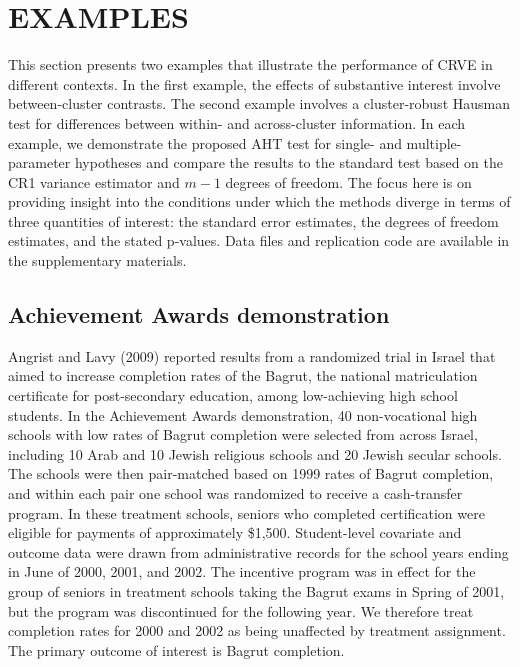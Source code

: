 \documentclass[12pt]{article}
\begin{document}
\hypertarget{sec:examples}{%
\section{EXAMPLES}\label{sec:examples}}

This section presents two examples that illustrate the performance of
CRVE in different contexts. In the first example, the effects of
substantive interest involve between-cluster contrasts. The second
example involves a cluster-robust Hausman test for differences between
within- and across-cluster information. In each example, we demonstrate
the proposed AHT test for single- and multiple-parameter hypotheses and
compare the results to the standard test based on the CR1 variance
estimator and \(m - 1\) degrees of freedom. The focus here is on
providing insight into the conditions under which the methods diverge in
terms of three quantities of interest: the standard error estimates, the
degrees of freedom estimates, and the stated p-values. Data files and
replication code are available in the supplementary materials.

\hypertarget{achievement-awards-demonstration}{%
\subsection{Achievement Awards
demonstration}\label{achievement-awards-demonstration}}

Angrist and Lavy (2009) reported results from a randomized trial in
Israel that aimed to increase completion rates of the Bagrut, the
national matriculation certificate for post-secondary education, among
low-achieving high school students. In the Achievement Awards
demonstration, 40 non-vocational high schools with low rates of Bagrut
completion were selected from across Israel, including 10 Arab and 10
Jewish religious schools and 20 Jewish secular schools. The schools were
then pair-matched based on 1999 rates of Bagrut completion, and within
each pair one school was randomized to receive a cash-transfer program.
In these treatment schools, seniors who completed certification were
eligible for payments of approximately \$1,500. Student-level covariate
and outcome data were drawn from administrative records for the school
years ending in June of 2000, 2001, and 2002. The incentive program was
in effect for the group of seniors in treatment schools taking the
Bagrut exams in Spring of 2001, but the program was discontinued for the
following year. We therefore treat completion rates for 2000 and 2002 as
being unaffected by treatment assignment. The primary outcome of
interest is Bagrut completion.
\end{document}
